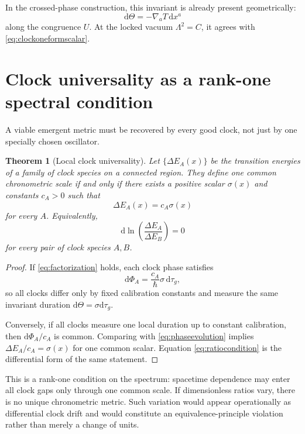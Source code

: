 \documentclass[11pt,a4paper]{article}
\newtheorem{theorem}[definition]{Theorem}
\newcommand{\dd}{\mathrm{d}}
\newcommand{\Ccross}{C}
\newcommand{\ThetaClock}{\Theta}
\begin{document}
In the crossed-phase construction, this invariant is already present geometrically:
\[
\dd\ThetaClock=-\nabla_aT\,\dd x^a
\]
along the congruence $U$. At the locked vacuum $\Lambda^2=\Ccross$, it agrees with \eqref{eq:clockoneformscalar}.

\section{Clock universality as a rank-one spectral condition}

A viable emergent metric must be recovered by every good clock, not just by one specially chosen oscillator.

\begin{theorem}[Local clock universality]
Let $\{\Delta E_A(x)\}$ be the transition energies of a family of clock species on a connected region. They define one common chronometric scale if and only if there exists a positive scalar $\sigma(x)$ and constants $c_A>0$ such that
\begin{equation}
\Delta E_A(x)=c_A\sigma(x)
\label{eq:factorization}
\end{equation}
for every $A$.
Equivalently,
\begin{equation}
\dd\ln\left(\frac{\Delta E_A}{\Delta E_B}\right)=0
\label{eq:ratiocondition}
\end{equation}
for every pair of clock species $A,B$.
\end{theorem}

\begin{proof}
If \eqref{eq:factorization} holds, each clock phase satisfies
\[
\dd\Phi_A=\frac{c_A}{\hbar}\sigma\,\dd\tau_g,
\]
so all clocks differ only by fixed calibration constants and measure the same invariant duration $\dd\ThetaClock=\sigma\dd\tau_g$.

Conversely, if all clocks measure one local duration up to constant calibration, then $\dd\Phi_A/c_A$ is common. Comparing with \eqref{eq:phaseevolution} implies $\Delta E_A/c_A=\sigma(x)$ for one common scalar. Equation \eqref{eq:ratiocondition} is the differential form of the same statement.
\end{proof}

This is a rank-one condition on the spectrum: spacetime dependence may enter all clock gaps only through one common scale. If dimensionless ratios vary, there is no unique chronometric metric. Such variation would appear operationally as differential clock drift and would constitute an equivalence-principle violation rather than merely a change of units.
\end{document}
